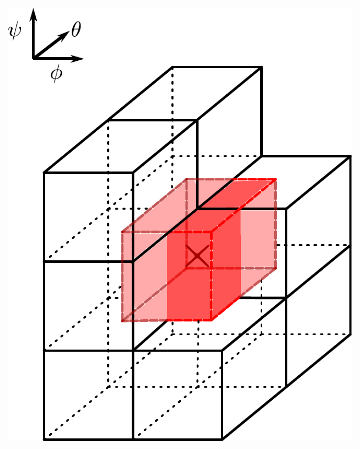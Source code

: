 \begin{figure}[H]
	\centering
	\begin{subfigure}[b]{0.24\textwidth}
		\centering
		\includegraphics[width=1\textwidth]{schemes/BoundingBoxStaggeredPoint.pdf}
		\label{fig:StaggeredCell}
	\end{subfigure}
	\begin{subfigure}[b]{0.24\textwidth}
		\centering

\end{subfigure}
\end{figure}
